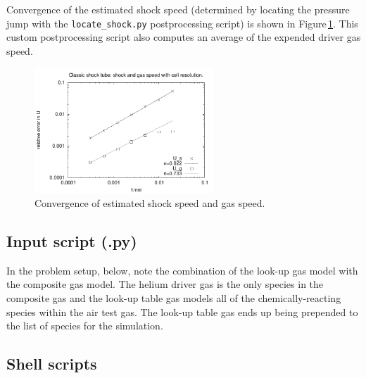 Convergence of the estimated shock speed (determined by locating the pressure jump with
the \texttt{locate\_shock.py} postprocessing script) is shown in Figure\,\ref{cst-convergence-fig}.
This custom postprocessing script also computes an average of the expended driver gas speed.

\begin{figure}[htbp]
\begin{center}
\includegraphics[width=0.6\textwidth]{../2D/classic-shock-tube/cst-errors.pdf}
\end{center}
\caption{Convergence of estimated shock speed and gas speed.}
\label{cst-convergence-fig}
\end{figure}

\newpage
\subsection{Input script (.py)}
\label{cst-py-file}
%
In the problem setup, below, note the combination of the look-up gas model with the composite gas model.
The helium driver gas is the only species in the composite gas and the look-up table gas models
all of the chemically-reacting species within the air test gas.
The look-up table gas ends up being prepended to the list of species for the simulation.

\noindent
\topbar

\bottombar

\newpage
\subsection{Shell scripts}
\label{cst-sh-files}
\topbar

\bottombar

\noindent
\topbar

\bottombar


